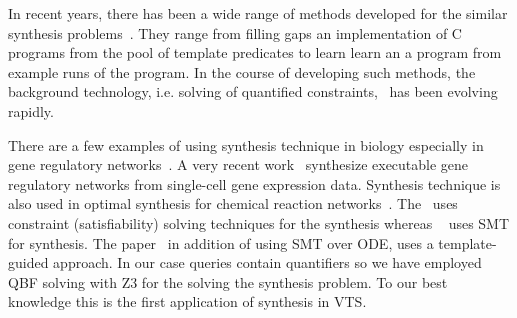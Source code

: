 In recent years, there has been a wide range of methods
developed for the similar synthesis problems~\cite{sketch,sygus,exampleSynth}.
%
They range from filling gaps an implementation of C programs from the
pool of template predicates to learn learn an a program from example
runs of the program.
%
In the course of developing such methods,
the background technology, i.e. solving of quantified
constraints,~\cite{lonsing2010depqbf,z3Quant} has been evolving rapidly.

There are a few examples of using synthesis technique in biology especially in gene regulatory networks~\cite{shavit2016automated, fisher2015synthesising}. A very recent work~\cite{fisher2015synthesising} synthesize executable gene regulatory networks from single-cell gene expression data. 
Synthesis technique is also used in optimal synthesis for chemical reaction networks~\cite{cardelli2017syntax}. The~\cite{fisher2015synthesising} uses constraint (satisfiability) solving techniques for the synthesis whereas ~\cite{shavit2016automated} uses SMT for synthesis. The paper~\cite{cardelli2017syntax} in addition of using SMT over ODE, uses a template-guided approach. In our case queries contain quantifiers so we have employed QBF solving with Z3 for the solving the synthesis problem. To our best knowledge this is the first application of synthesis in VTS.
